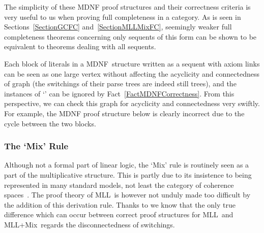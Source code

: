 \documentclass{LMCS}
\theoremstyle{plain}\newtheorem*{cLm}{Claim}
\newcommand{\mll}{MLL} \newcommand{\mall}{MALL}
\newcommand{\mllmix}{MLL+Mix} \newcommand{\GRel}{\mathbf{GRel}}
\newcommand{\p}{} \newcommand{\N}{\mathbb{N}}
\newcommand{\hughh}[1]{#1}
\begin{document}
\hughh{The simplicity of these MDNF proof structures and their correctness criteria is very useful to us when proving full completeness in a category. As is seen in Sections~\ref{SectionGCFC} and~\ref{SectionMLLMixFC}, seemingly weaker full completeness theorems concerning only sequents of this form can be shown to be equivalent to theorems dealing with all sequents.}

\p \hughh{Each block of literals in a MDNF~structure written as a sequent with axiom links can be seen as one large vertex without affecting the acyclicity and connectedness of graph (the switchings of their parse trees are indeed still trees), and the instances of `' can be ignored by Fact~\ref{FactMDNFCorrectness}. From this perspective, we can check this graph for acyclicity and connectedness very swiftly. For example, the MDNF proof structure below is clearly incorrect due to the cycle between the two blocks.}

\begin{center} \vspace{5mm}
 \vspace{2mm}
\end{center}

\subsubsection{The `Mix' Rule}

Although not a formal part of linear logic, the `Mix' rule is routinely seen as a part of the multiplicative structure. This is partly due to its insistence to being represented in many standard models, not least the category of coherence spaces~\cite{Gir87}. The proof theory of \mll\ is however not unduly made too difficult by the addition of this derivation rule. Thanks to \cite{FR94} we know that the only true difference which can occur between correct proof structures for \mll\ and \mllmix\ regards the disconnectedness of switchings.
\end{document}
